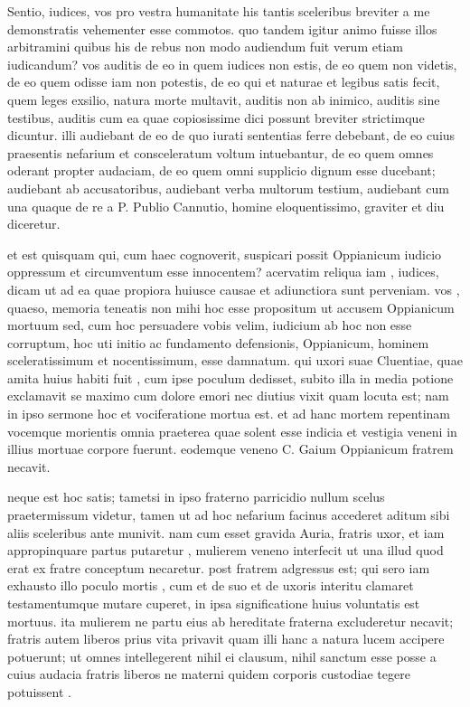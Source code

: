  Sentio, iudices, vos pro vestra humanitate his tantis sceleribus breviter a me demonstratis vehementer esse commotos. quo tandem igitur animo fuisse illos arbitramini quibus his de rebus non modo audiendum fuit verum etiam iudicandum? vos auditis de eo in quem iudices non estis, de eo quem non videtis, de eo quem odisse iam non potestis, de eo qui et naturae et legibus satis fecit, quem leges exsilio, natura morte multavit, auditis non ab inimico, auditis sine testibus, auditis cum ea quae copiosissime dici possunt breviter strictimque dicuntur. illi audiebant de eo de quo iurati sententias ferre debebant, de eo cuius praesentis nefarium et consceleratum voltum intuebantur, de eo quem omnes oderant propter audaciam, de eo quem omni supplicio dignum esse ducebant; audiebant ab accusatoribus, audiebant verba multorum testium, audiebant cum una quaque de re a P. Publio Cannutio, homine eloquentissimo, graviter et diu diceretur.

 et est quisquam qui, cum haec cognoverit, suspicari possit Oppianicum iudicio oppressum et circumventum esse innocentem? acervatim reliqua iam , iudices, dicam ut ad ea quae propiora huiusce causae et adiunctiora sunt perveniam. vos , quaeso, memoria teneatis non mihi hoc esse propositum ut accusem Oppianicum mortuum sed, cum hoc persuadere vobis velim, iudicium ab hoc non esse corruptum, hoc uti initio ac fundamento defensionis, Oppianicum, hominem sceleratissimum et nocentissimum, esse damnatum. qui uxori suae Cluentiae, quae amita huius habiti fuit , cum ipse poculum dedisset, subito illa in media potione exclamavit se maximo cum dolore emori nec diutius vixit quam locuta est; nam in ipso sermone hoc et vociferatione mortua est. et ad hanc mortem repentinam vocemque morientis omnia praeterea quae solent esse indicia et vestigia veneni in illius mortuae corpore fuerunt. eodemque veneno C. Gaium Oppianicum fratrem necavit.

 neque est hoc satis; tametsi in ipso fraterno parricidio nullum scelus praetermissum videtur, tamen ut ad hoc nefarium facinus accederet aditum sibi aliis sceleribus ante munivit. nam cum esset gravida Auria, fratris uxor, et iam appropinquare partus putaretur , mulierem veneno interfecit ut una illud quod erat ex fratre conceptum necaretur. post fratrem adgressus est; qui sero iam exhausto illo poculo mortis , cum et de suo et de uxoris interitu clamaret testamentumque mutare cuperet, in ipsa significatione huius voluntatis est mortuus. ita mulierem ne partu eius ab hereditate fraterna excluderetur necavit; fratris autem liberos prius vita privavit quam illi hanc a natura lucem accipere potuerunt; ut omnes intellegerent nihil ei clausum, nihil sanctum esse posse a cuius audacia fratris liberos ne materni quidem corporis custodiae tegere potuissent .


